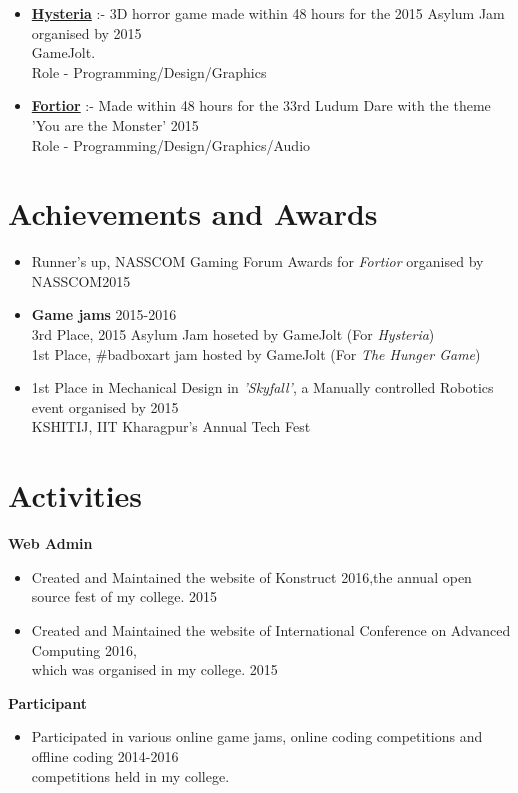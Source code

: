 \documentclass[margin, centered]{res}
\begin{document}
\begin{resume}
\begin{itemize}[leftmargin=*]
	\item \textbf{\href{http://gamejolt.com/games/hysteria/107191}{Hysteria}} :- 3D horror game made within 48 hours for the 2015 Asylum Jam organised by \hfill 2015 \\GameJolt. \\Role - Programming/Design/Graphics
	\item \textbf{\href{http://gamejolt.com/games/fortior/88093}{Fortior}} :- Made within 48 hours for the 33rd Ludum Dare with the theme 'You are the Monster' \hfill 2015
	\\Role - Programming/Design/Graphics/Audio
\end{itemize}

\section{Achievements and Awards}
\begin{itemize}[leftmargin=*]
\item Runner's up, NASSCOM Gaming Forum Awards for \textit{Fortior} organised by NASSCOM\hfill 2015
\item \textbf{Game jams} \hfill 2015-2016
\\
3rd Place, 2015 Asylum Jam hoseted by GameJolt (For \textit{Hysteria})\\
1st Place, \#badboxart jam hosted by GameJolt (For \textit{The Hunger Game})
\item 1st Place in Mechanical Design in \textit{'Skyfall'}, a Manually controlled Robotics event organised by \hfill2015 \\ KSHITIJ, IIT Kharagpur's Annual Tech Fest
\end{itemize}

\section{Activities}
\textbf{Web Admin}
\begin{itemize}[leftmargin=*]
\item Created and Maintained the website of Konstruct 2016,the  annual open source fest of my college. \hfill 2015
\item Created and Maintained the website of International Conference on Advanced Computing 2016,\\ which was organised in my college. \hfill 2015
\end{itemize} 
\textbf{Participant}
\begin{itemize}[leftmargin=*]
\item Participated in various online game jams, online coding competitions and offline coding \hfill 2014-2016 \\    competitions held in my college. 
\end{itemize}

\end{resume}
\end{document}
